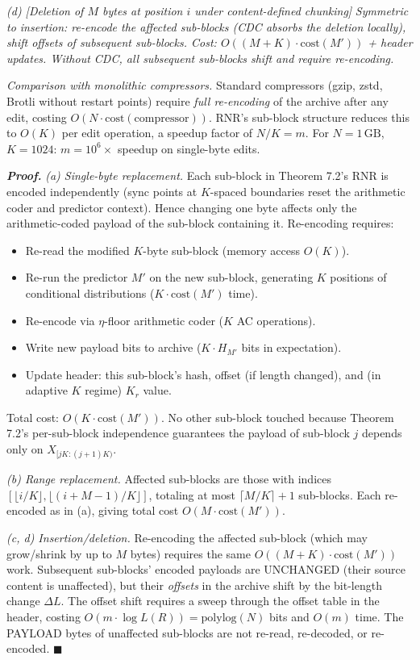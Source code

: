 \documentclass[
]{article}
\begin{document}
\emph{(d) [Deletion of $M$ bytes at position $i$ under content-defined
chunking]} \emph{Symmetric to insertion: re-encode the affected
sub-blocks (CDC absorbs the deletion locally), shift offsets of
subsequent sub-blocks. Cost: $O((M+K) \cdot \mathrm{cost}(M'))$ +
header updates. Without CDC, all subsequent sub-blocks shift and
require re-encoding.}

\emph{Comparison with monolithic compressors.} Standard compressors
(gzip, zstd, Brotli without restart points) require \emph{full
re-encoding} of the archive after any edit, costing
$O(N \cdot \mathrm{cost}(\text{compressor}))$. RNR's sub-block
structure reduces this to $O(K)$ per edit operation, a speedup factor
of $N/K = m$. For $N = 1\,\mathrm{GB}$, $K = 1024$: $m = 10^6\times$
speedup on single-byte edits.

\emph{\textbf{Proof.}} \emph{(a) Single-byte replacement.}
Each sub-block in Theorem 7.2's RNR is encoded independently (sync
points at $K$-spaced boundaries reset the arithmetic coder and
predictor context). Hence changing one byte affects only the
arithmetic-coded payload of the sub-block containing it.
Re-encoding requires:
\begin{itemize}
\item Re-read the modified $K$-byte sub-block (memory access $O(K)$).
\item Re-run the predictor $M'$ on the new sub-block, generating $K$
positions of conditional distributions ($K \cdot \mathrm{cost}(M')$
time).
\item Re-encode via $\eta$-floor arithmetic coder ($K$ AC operations).
\item Write new payload bits to archive ($K \cdot H_{M'}$ bits in
expectation).
\item Update header: this sub-block's hash, offset (if length
changed), and (in adaptive $K$ regime) $K_r$ value.
\end{itemize}
Total cost: $O(K \cdot \mathrm{cost}(M'))$. No other sub-block touched
because Theorem 7.2's per-sub-block independence guarantees the
payload of sub-block $j$ depends only on $X_{[jK : (j+1)K)}$.

\emph{(b) Range replacement.} Affected sub-blocks are those with
indices $[\lfloor i/K \rfloor, \lfloor (i+M-1)/K \rfloor]$, totaling
at most $\lceil M/K \rceil + 1$ sub-blocks. Each re-encoded as in (a),
giving total cost $O(M \cdot \mathrm{cost}(M'))$.

\emph{(c, d) Insertion/deletion.} Re-encoding the affected sub-block
(which may grow/shrink by up to $M$ bytes) requires the same $O((M+K)
\cdot \mathrm{cost}(M'))$ work. Subsequent sub-blocks' encoded
payloads are UNCHANGED (their source content is unaffected), but
their \emph{offsets} in the archive shift by the bit-length change
$\Delta L$. The offset shift requires a sweep through the offset
table in the header, costing $O(m \cdot \log L(R)) = \mathrm{polylog}(N)$
bits and $O(m)$ time. The PAYLOAD bytes of unaffected sub-blocks are
not re-read, re-decoded, or re-encoded.
\hfill$\blacksquare$
\end{document}
